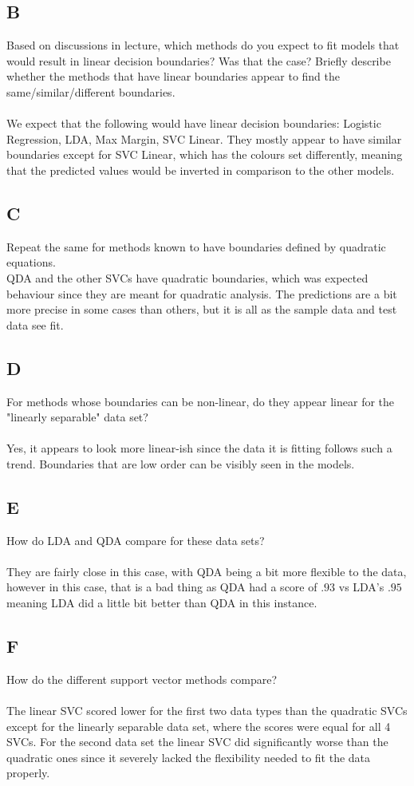 \documentclass[12pt]{article}
\begin{document}
\subsection{B}
Based on discussions in lecture, which methods do you expect to fit models that would result in linear decision boundaries? Was that the case? Briefly describe whether the methods that have linear boundaries appear to find the same/similar/different boundaries.\\\\
We expect that the following would have linear decision boundaries: Logistic Regression, LDA, Max Margin, SVC Linear. They mostly appear to have similar boundaries except for SVC Linear, which has the colours set differently, meaning that the predicted values would be inverted in comparison to the other models.

\subsection{C}
Repeat the same for methods known to have boundaries defined by quadratic equations.\\
QDA and the other SVCs have quadratic boundaries, which was expected behaviour since they are meant for quadratic analysis. The predictions are a bit more precise in some cases than others, but it is all as the sample data and test data see fit.

\subsection{D}
For methods whose boundaries can be non-linear, do they appear linear for the "linearly separable" data set?\\\\
Yes, it appears to look more linear-ish since the data it is fitting follows such a trend. Boundaries that are low order can be visibly seen in the models.

\subsection{E}
How do LDA and QDA compare for these data sets?\\\\
They are fairly close in this case, with QDA being a bit more flexible to the data, however in this case, that is a bad thing as QDA had a score of $.93$ vs LDA's $.95$ meaning LDA did a little bit better than QDA in this instance.

\subsection{F}
How do the different support vector methods compare?\\\\
The linear SVC scored lower for the first two data types than the quadratic SVCs except for the linearly separable data set, where the scores were equal for all 4 SVCs. For the second data set the linear SVC did significantly worse than the quadratic ones since it severely lacked the flexibility needed to fit the data properly.

\end{document}
